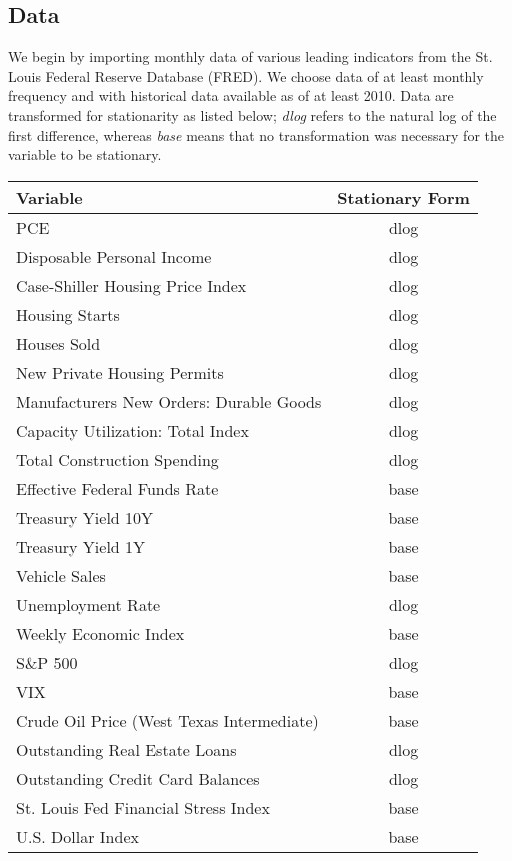 \documentclass[11pt, letterpaper]{article}\usepackage[]{graphicx}\usepackage[]{color}
\begin{document}
\subsection{Data}
We begin by importing monthly data of various leading indicators from the St. Louis Federal Reserve Database (FRED). We choose data of at least monthly frequency and with historical data available as of at least 2010. Data are transformed for stationarity as listed below; \textit{dlog} refers to the natural log of the first difference, whereas \textit{base} means that no transformation was necessary for the variable to be stationary.

\begin{table}[H]
\centering
\begingroup\scriptsize
\begin{tabular}{lc}
  \hline
Variable & Stationary Form \\ 
  \hline
PCE & dlog \\ 
  Disposable Personal Income & dlog \\ 
  Case-Shiller Housing Price Index & dlog \\ 
  Housing Starts & dlog \\ 
  Houses Sold & dlog \\ 
  New Private Housing Permits & dlog \\ 
  Manufacturers New Orders: Durable Goods & dlog \\ 
  Capacity Utilization: Total Index & dlog \\ 
  Total Construction Spending & dlog \\ 
  Effective Federal Funds Rate & base \\ 
  Treasury Yield 10Y & base \\ 
  Treasury Yield 1Y & base \\ 
  Vehicle Sales & base \\ 
  Unemployment Rate & dlog \\ 
  Weekly Economic Index & base \\ 
  S\&P 500 & dlog \\ 
  VIX & base \\ 
  Crude Oil Price (West Texas Intermediate) & base \\ 
  Outstanding Real Estate Loans & dlog \\ 
  Outstanding Credit Card Balances & dlog \\ 
  St. Louis Fed Financial Stress Index & base \\ 
  U.S. Dollar Index & base \\ 

\end{tabular}
\end{table}
\end{document}
